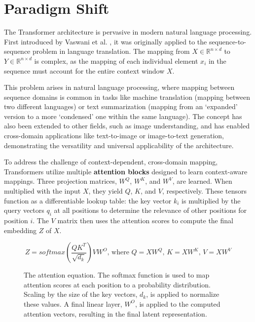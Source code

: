 \section{Paradigm Shift}

The Transformer architecture is pervasive in modern natural language processing. First introduced by Vaswani et al. \cite{DBLP:journals/corr/VaswaniSPUJGKP17}, it was originally applied to the sequence-to-sequence problem in language translation. The mapping from $X \in \mathbb{R}^{n \times d}$ to $Y \in \mathbb{R}^{n \times d}$ is complex, as the mapping of each individual element $x_i$ in the sequence must account for the entire context window $X$.

\vskip 0.2in

This problem arises in natural language processing, where mapping between sequence domains is common in tasks like machine translation (mapping between two different languages) or text summarization (mapping from an ‘expanded' version to a more ‘condensed' one within the same language). The concept has also been extended to other fields, such as image understanding, and has enabled cross-domain applications like text-to-image or image-to-text generation, demonstrating the versatility and universal applicability of the architecture.

\vskip 0.2in

To address the challenge of context-dependent, cross-domain mapping, Transformers utilize multiple \textbf{attention blocks} designed to learn context-aware mappings. Three projection matrices, $W^Q$, $W^K$, and $W^V$, are learned. When multiplied with the input $X$, they yield $Q$, $K$, and $V$, respectively. These tensors function as a differentiable lookup table: the key vector $k_i$ is multiplied by the query vectors $q_i$ at all positions to determine the relevance of other positions for position $i$. The $V$ matrix then uses the attention scores to compute the final embedding $Z$ of $X$.

\begin{figure}[h]
\[ Z = softmax(\frac{QK^T}{\sqrt{d_k}})VW^O \text{, where } Q = XW^Q\text{, }K = XW^K\text{, } V = XW^V \]
\caption[Attention Equation]{The attention equation. The softmax function is used to map attention scores at each position to a probability distribution. Scaling by the size of the key vectors, $d_k$, is applied to normalize these values. A final linear layer, $W^O$, is applied to the computed attention vectors, resulting in the final latent representation.}
\end{figure}

